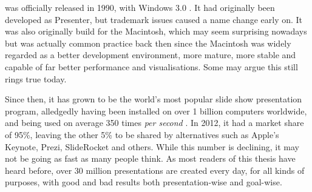    \ppt* was officially released in 1990, with Windows 3.0 \citep{austin-1}. It
   had originally been developed as Presenter, but trademark issues caused a
   name change early on. It was also originally build for the Macintosh, which
   may seem surprising nowadays but was actually common practice back then
   since the Macintosh was widely regarded as a better development environment,
   more mature, more stable and capable of far better performance and
   visualisations. Some may argue this still rings true today.

   Since then, it has grown to be the world's most popular slide show
   presentation program, alledgedly having been installed on over 1 billion
   computers worldwide, and being used on average 350 times \emph{per second}
   \citep{parks-1}. In 2012, it had a market share of 95\%, leaving the other
   5\% to be shared by alternatives such as Apple's Keynote, Prezi, SlideRocket
   and others. While this number is declining, it may not be going as fast as
   many people think. As most readers of this thesis have heard before, over 30
   million \ppt presentations are created every day, for all kinds of purposes,
   with good and bad results both presentation-wise and goal-wise.

